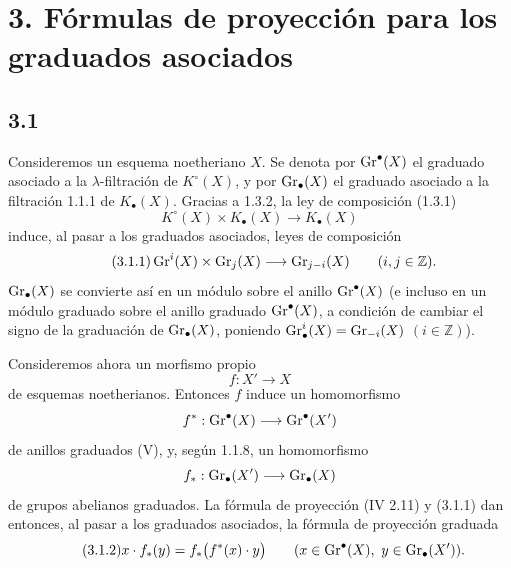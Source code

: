 
\section*{3. Fórmulas de proyección para los graduados asociados}

\subsection*{3.1}
Consideremos un esquema noetheriano \(X\). Se denota por \(\operatorname{Gr}^{\bullet}(X)\) el
graduado asociado a la \(\lambda\)-filtración de \(K^\circ(X)\), y por
\(\operatorname{Gr}_{\bullet}(X)\) el graduado asociado a la filtración 1.1.1 de \(K_\bullet(X)\).
Gracias a 1.3.2, la ley de composición (1.3.1)
\[
 K^\circ(X)\times K_\bullet(X)\longrightarrow K_\bullet(X)
\]
induce, al pasar a los graduados asociados, leyes de composición
\begin{equation}\tag{3.1.1}
 \operatorname{Gr}^i(X)\times\operatorname{Gr}_j(X)\longrightarrow \operatorname{Gr}_{j-i}(X)\qquad(i,j\in\mathbb Z).
\end{equation}
\(\operatorname{Gr}_{\bullet}(X)\) se convierte así en un módulo sobre el anillo \(\operatorname{Gr}^{\bullet}(X)\) (e
incluso en un módulo graduado sobre el anillo graduado \(\operatorname{Gr}^{\bullet}(X)\), a
condición de cambiar el signo de la graduación de \(\operatorname{Gr}_{\bullet}(X)\), poniendo
\(\operatorname{Gr}^i_\bullet(X)=\operatorname{Gr}_{-i}(X)\) \((i\in\mathbb Z)\)).

Consideremos ahora un morfismo propio
\[
 f:X'\longrightarrow X
\]
de esquemas noetherianos. Entonces \(f\) induce un homomorfismo
\[
 f^*:\operatorname{Gr}^{\bullet}(X)\longrightarrow\operatorname{Gr}^{\bullet}(X')
\]
de anillos graduados (V), y, según 1.1.8, un homomorfismo
\[
 f_*:\operatorname{Gr}_{\bullet}(X')\longrightarrow\operatorname{Gr}_{\bullet}(X)
\]
de grupos abelianos graduados. La fórmula de proyección (IV 2.11) y (3.1.1)
dan entonces, al pasar a los graduados asociados, la fórmula de proyección
graduada
\begin{equation}\tag{3.1.2}
 x\cdot f_*(y)=f_*\bigl(f^*(x)\cdot y\bigr)
 \qquad (x\in\operatorname{Gr}^{\bullet}(X),\ y\in\operatorname{Gr}_{\bullet}(X')).
\end{equation}

